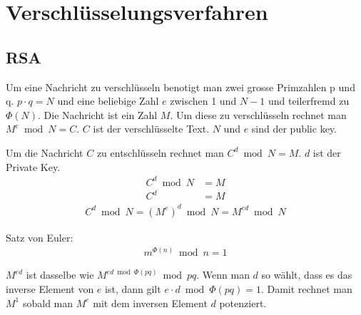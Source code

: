 \section{Verschlüsselungsverfahren}
\subsection{RSA}

Um eine Nachricht zu verschlüsseln benotigt man zwei grosse Primzahlen p und q.
$p \cdot q = N$ und eine beliebige Zahl $e$ zwischen 1 und $N-1$ und teilerfremd
zu $\Phi(N)$. Die Nachricht ist ein Zahl $M$. Um diese zu verschlüsseln rechnet
man $M^e \bmod N = C$. $C$ ist der verschlüsselte Text. $N$ und $e$ sind der
public key.

Um die Nachricht $C$ zu entschlüsseln rechnet man $C^d \bmod N = M$. $d$ ist der
Private Key.
\begin{align*}
	C^d \bmod N &= M \\
	C^d & = M
\end{align*}
\begin{align*}
	C^d \bmod N  =  (M^e)^d \bmod N = M^{ed} \bmod N
\end{align*}

Satz von Euler:
\begin{align*}
m^{\Phi (n)} \bmod n = 1
\end{align*}

$M^{ed}$ ist dasselbe wie $M^{ed \bmod \Phi (pq)} \bmod pq$. Wenn man $d$ so
wählt, dass es das inverse Element von $e$ ist, dann gilt $e \cdot d \bmod
\Phi(pq) = 1$. Damit rechnet man $M^1$ sobald man $M^e$ mit dem inversen Element
$d$ potenziert.

